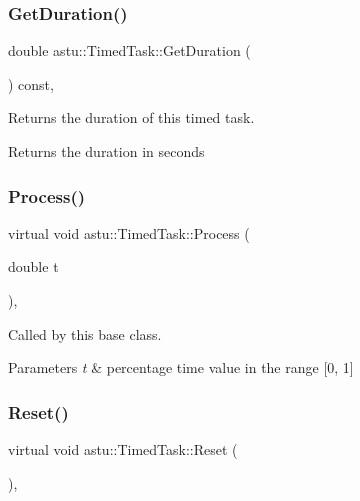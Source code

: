 \subsubsection{\texorpdfstring{Get\+Duration()}{GetDuration()}}
{\footnotesize\ttfamily double astu\+::\+Timed\+Task\+::\+Get\+Duration (\begin{DoxyParamCaption}{ }\end{DoxyParamCaption}) const\hspace{0.3cm}{\ttfamily [inline]}, {\ttfamily [protected]}}

Returns the duration of this timed task.

\begin{DoxyReturn}{Returns}
the duration in seconds 
\end{DoxyReturn}
\mbox{\label{classastu_1_1TimedTask_a10e9c957bb0fa2013d2d1ca04a0e0b55}} 
\subsubsection{\texorpdfstring{Process()}{Process()}}
{\footnotesize\ttfamily virtual void astu\+::\+Timed\+Task\+::\+Process (\begin{DoxyParamCaption}\item[{double}]{t }\end{DoxyParamCaption})\hspace{0.3cm}{\ttfamily [protected]}, {}}

Called by this base class.


\begin{DoxyParams}{Parameters}
{\em t} & percentage time value in the range \mbox{[}0, 1\mbox{]} \\
\hline
\end{DoxyParams}
\mbox{\label{classastu_1_1TimedTask_ac885f7d65aab450125fc4e00eb045a82}} 
\subsubsection{\texorpdfstring{Reset()}{Reset()}}
{\footnotesize\ttfamily virtual void astu\+::\+Timed\+Task\+::\+Reset (\begin{DoxyParamCaption}{ }\end{DoxyParamCaption})\hspace{0.3cm}{\ttfamily [override]}, {\ttfamily [virtual]}}

